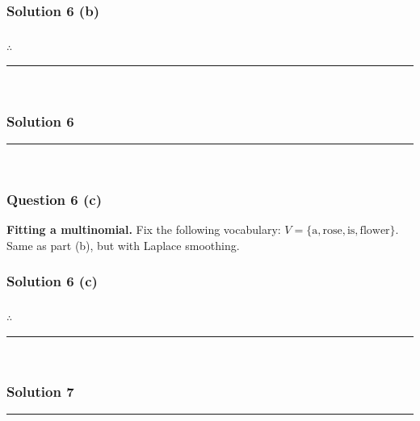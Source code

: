 \documentclass{article}
\begin{document}
\subsubsection*{Solution 6 (b)}


\subsubsection*{\normalfont}{$\therefore$ } \\

\noindent\rule{\textwidth}{0.4pt}\\

\newpage

\subsubsection*{Solution 6}
\noindent\rule{\textwidth}{0.4pt}\\
\subsubsection*{Question 6 (c)}
\begin{flushleft}
    \textbf{Fitting a multinomial.} Fix the following vocabulary: $V=\{\mathrm{a}, \mathrm{rose}, \mathrm{is}, \mathrm{flower}\}$.\\
    Same as part (b), but with Laplace smoothing.
\end{flushleft}

\subsubsection*{Solution 6 (c)}


\subsubsection*{\normalfont}{$\therefore$ } \\

\noindent\rule{\textwidth}{0.4pt}\\

\newpage

\subsubsection*{Solution 7}
\noindent\rule{\textwidth}{0.4pt}\\
\end{document}
